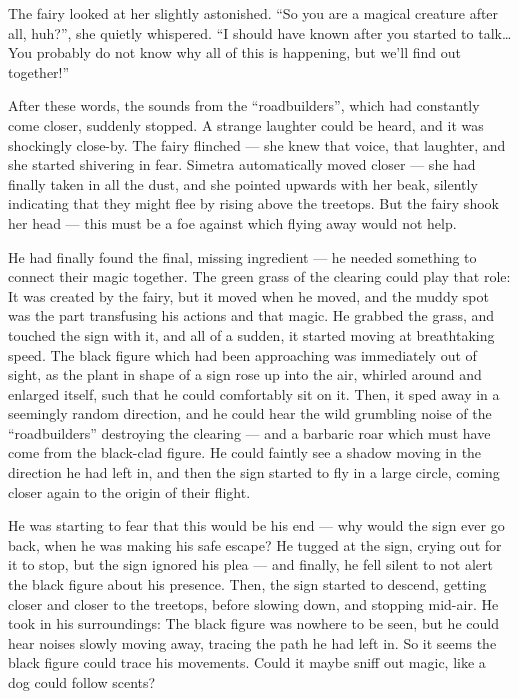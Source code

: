 The fairy looked at her slightly astonished. \enquote{So you are a magical creature after all, huh?}, she quietly whispered. \enquote{I should have known after you started to talk\dots You probably do not know why all of this is happening, but we'll find out together!}

After these words, the sounds from the \enquote{roadbuilders}, which had constantly come closer, suddenly stopped. A strange laughter could be heard, and it was shockingly close-by. The fairy flinched --- she knew that voice, that laughter, and she started shivering in fear. Simetra automatically moved closer --- she had finally taken in all the dust, and she pointed upwards with her beak, silently indicating that they might flee by rising above the treetops. But the fairy shook her head --- this must be a foe against which flying away would not help.

\froufrou{}

He had finally found the final, missing ingredient --- he needed something to connect their magic together. The green grass of the clearing could play that role: It was created by the fairy, but it moved when he moved, and the muddy spot was the part transfusing his actions and that magic. He grabbed the grass, and touched the sign with it, and all of a sudden, it started moving at breathtaking speed. The black figure which had been approaching was immediately out of sight, as the plant in shape of a sign rose up into the air, whirled around and enlarged itself, such that he could comfortably sit on it. Then, it sped away in a seemingly random direction, and he could hear the wild grumbling noise of the \enquote{roadbuilders} destroying the clearing --- and a barbaric roar which must have come from the black-clad figure. He could faintly see a shadow moving in the direction he had left in, and then the sign started to fly in a large circle, coming closer again to the origin of their flight.

He was starting to fear that this would be his end --- why would the sign ever go back, when he was making his safe escape? He tugged at the sign, crying out for it to stop, but the sign ignored his plea --- and finally, he fell silent to not alert the black figure about his presence. Then, the sign started to descend, getting closer and closer to the treetops, before slowing down, and stopping mid-air. He took in his surroundings: The black figure was nowhere to be seen, but he could hear noises slowly moving away, tracing the path he had left in. So it seems the black figure could trace his movements. Could it maybe sniff out magic, like a dog could follow scents?

